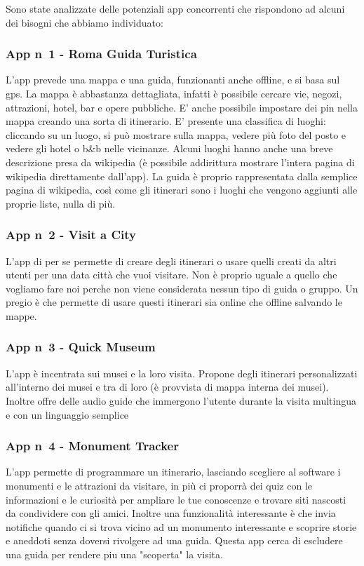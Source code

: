 Sono state analizzate delle potenziali app concorrenti che rispondono ad alcuni dei bisogni
che abbiamo individuato:

\subsubsection*{App n\degree \ 1 - Roma Guida Turistica}
L'app prevede una mappa e una guida, funzionanti anche offline, e si basa sul gps.
La mappa è abbastanza dettagliata, infatti è possibile cercare vie,
negozi, attrazioni, hotel, bar e opere pubbliche.
E’ anche possibile impostare dei pin nella mappa creando una sorta di itinerario.
E’ presente una classifica di luoghi: cliccando su un luogo, si può mostrare sulla mappa,
vedere più foto del posto e vedere gli hotel o b\&b nelle vicinanze.
Alcuni luoghi hanno anche una breve descrizione presa da wikipedia
(è possibile addirittura mostrare l’intera pagina di wikipedia direttamente dall’app).
La guida è proprio rappresentata dalla semplice pagina di wikipedia, 
così come gli itinerari sono i luoghi che vengono aggiunti alle proprie liste, nulla di più.

\subsubsection*{App n\degree \ 2 - Visit a City}
L'app di per se permette di creare degli itinerari o usare quelli creati da altri utenti per una data città che vuoi visitare. Non è proprio uguale a quello che vogliamo fare noi perche non viene considerata nessun tipo di guida o gruppo.
Un pregio è che permette di usare questi itinerari sia online che offline salvando le mappe.

\subsubsection*{App n\degree \ 3 - Quick Museum}
L'app è incentrata sui musei e la loro visita. Propone degli itinerari personalizzati all'interno dei musei e tra di loro (è provvista di mappa interna dei musei).
Inoltre offre delle audio guide che immergono l'utente durante la visita multingua e con un linguaggio semplice

\subsubsection*{App n\degree \ 4 - Monument Tracker}
L'app permette di programmare un itinerario, lasciando scegliere al software i monumenti e le attrazioni da visitare, in più ci proporrà dei quiz con le informazioni e le curiosità per ampliare le tue conoscenze e trovare siti nascosti da condividere con gli amici. Inoltre una funzionalità interessante è che invia notifiche quando ci si trova vicino ad un monumento interessante e scoprire storie e aneddoti senza doversi rivolgere ad una guida.
Questa app cerca di escludere una guida per rendere piu una "scoperta" la visita.